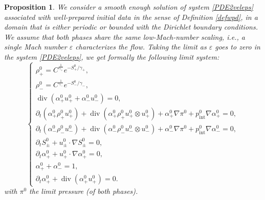 \documentclass[10pt,a4paper]{amsart}
\newtheorem{proposition}{Proposition}
\newcommand{\am}{\alpha_-}
\newcommand{\ap}{\alpha_+}
\renewcommand{\div}{\operatorname{div}}
\newcommand{\dt}{\partial_t}
\newcommand{\eps}{\varepsilon}
\renewcommand{\epsilon}{\varepsilon}
\newcommand{\gm}{\gamma_-}
\newcommand{\gp}{\gamma_{+}}
\newcommand{\rmi}{\rho_-}
\newcommand{\rp}{\rho_+}
\begin{document}
\begin{proposition}
We consider a smooth enough solution of system \eqref{PDE2veleps} associated with well-prepared initial data in the sense of Definition \eqref{defwpd}, in a domain that is either periodic or bounded with the Dirichlet boundary conditions. We assume that both phases share the same low-Mach-number scaling, i.e., a single Mach number $\epsilon$ characterizes the flow. Taking the limit as $\eps$ goes to zero in the system \eqref{PDE2veleps}, we get formally the following limit system:
\begin{equation*}
    \begin{cases}
        \rp^0 = C^{\frac{1}{\gp}}e^{-S_+^0/\gp},\\
        \rmi^0 = C^{\frac{1}{\gm}}e^{-S_-^0/\gm},\\
        \div (\ap^0 u_+^0 +\am^0 u_-^0) = 0,\\
        \dt (\ap^0 \rp^0 u_+^0) + \div (\ap^0 \rp^0 u_+^0 \otimes u_+^0) + \ap^0 \nabla \pi^0 + p_{\mathrm{int}}^0 \nabla \ap^0 = 0,\\
        \dt (\am^0 \rmi^0 u_-^0) + \div (\am^0 \rmi^0 u_-^0 \otimes u_-^0) + \am^0 \nabla \pi^0 + p_{\mathrm{int}}^0 \nabla \am^0 = 0,\\
        \dt S_\pm^0 + u_\pm^0 \cdot \nabla S_\pm^0=0,\\
        \dt \alpha_+^0 + u_+^0 \cdot \nabla \alpha_+^0 = 0,\\
        \ap^0 + \am^0 = 1,\\
        \dt \alpha_+^0 + \div (\alpha_+^0 u_+^0) = 0.
    \end{cases}
\end{equation*}
with $\pi^0$ the limit pressure (of both phases).
\end{proposition}
\end{document}
